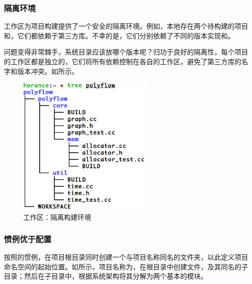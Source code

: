 \begin{content}
\subsubsection{隔离环境}

工作区为项目构建提供了一个安全的隔离环境。例如，本地存在两个待构建的\cpp{}项目和，它们都依赖于第三方\cpp{}库。不幸的是，它们分别依赖了不同的版本实现和。

问题变得非常棘手，系统目录应该放哪个版本呢？归功于良好的隔离性，每个项目的工作区都是独立的，它们将所有依赖控制在各自的工作区，避免了第三方库的名字和版本冲突。如所示。

\begin{figure}[H]
\centering
\includegraphics[width=0.6\textwidth]{figures/bazel-concept-polyflow.png}
\caption{工作区：隔离构建环境}
 \label{fig:bazel-concept-conflict}
\end{figure}

\subsubsection{惯例优于配置}

按照的惯例，在项目根目录同时创建一个与项目名称同名的文件夹，以此定义项目命名空间的起始位置。如所示，项目名称为，在根目录中创建文件，及其同名的子目录；然后在子目录中，根据系统架构将其分解为两个基本的模块。


\end{content}
